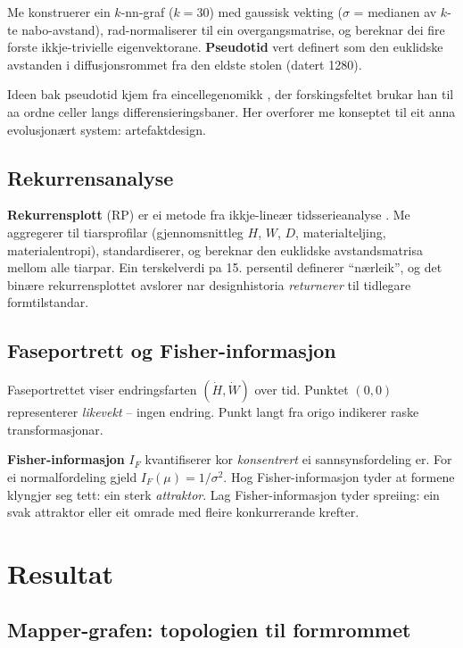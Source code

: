\documentclass[10pt, a4paper, twocolumn]{article}
\begin{document}
Me konstruerer ein $k$-nn-graf ($k = 30$) med gaussisk vekting ($\sigma$ = medianen av $k$-te nabo-avstand), rad-normaliserer til ein overgangsmatrise, og bereknar dei fire forste ikkje-trivielle eigenvektorane. \textbf{Pseudotid} vert definert som den euklidske avstanden i diffusjonsrommet fra den eldste stolen (datert 1280).

Ideen bak pseudotid kjem fra eincellegenomikk \citep{trapnell2014}, der forskingsfeltet brukar han til aa ordne celler langs differensieringsbaner. Her overforer me konseptet til eit anna evolusjon\ae{}rt system: artefaktdesign.

\subsection{Rekurrensanalyse}

\textbf{Rekurrensplott} (RP) er ei metode fra ikkje-line\ae{}r tidsserieanalyse \citep{eckmann1987}. Me aggregerer til tiarsprofil\-ar (gjennomsnittleg $H$, $W$, $D$, materialteljing, materialentropi), standardiserer, og bereknar den euklidske avstandsmatrisa mellom alle tiarpar. Ein terskel\-verdi pa 15. persentil definerer ``n\ae{}rleik'', og det bin\ae{}re rekurrensplottet avslorer nar designhistoria \emph{returnerer} til tidlegare formtilstandar.

\subsection{Faseportrett og Fisher-informasjon}

Faseportrettet viser endringsfarten $(\dot{H}, \dot{W})$ over tid. Punktet $(0, 0)$ representerer \emph{likevekt} -- ingen endring. Punkt langt fra origo indikerer raske transformasjonar.

\textbf{Fisher-informasjon} $I_F$ kvantifiserer kor \emph{konsentrert} ei sannsynsfordeling er. For ei normalfordeling gjeld $I_F(\mu) = 1/\sigma^2$. Hog Fisher-informasjon tyder at formene klyngjer seg tett: ein sterk \emph{attraktor}. Lag Fisher-informasjon tyder spreiing: ein svak attraktor eller eit omrade med fleire konkurrerande krefter.


\section{Resultat}

\subsection{Mapper-grafen: topologien til formrommet}
\end{document}
